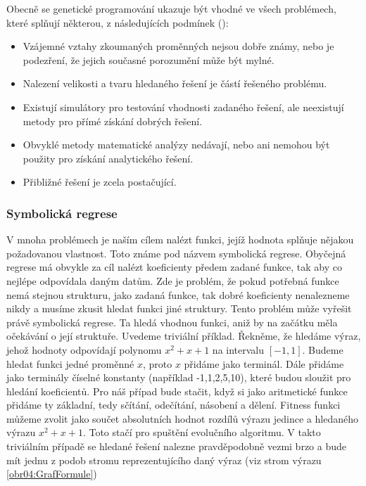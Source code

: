 Obecně se genetické programování ukazuje být vhodné ve všech problémech, které splňují některou, z následujících podmínek (\cite{fieldGuideUsage}):



\begin{itemize}
    \item Vzájemné vztahy zkoumaných proměnných nejsou dobře známy, nebo je podezření, že jejich současné porozumění může být mylné.
    \item Nalezení velikosti a tvaru hledaného řešení je částí řešeného problému.
    \item Existují simulátory pro testování vhodnosti zadaného řešení, ale neexistují metody pro přímé získání dobrých řešení.
    \item Obvyklé metody matematické analýzy nedávají, nebo ani nemohou být použity pro získání analytického řešení.
    \item Přibližné řešení je zcela postačující.
    
\end{itemize}



\subsubsection{Symbolická regrese}
V mnoha problémech je naším cílem nalézt funkci, jejíž hodnota splňuje nějakou požadovanou vlastnost. Toto známe pod názvem symbolická regrese.
Obyčejná regrese má obvykle za cíl nalézt koeficienty předem zadané funkce, tak aby co nejlépe odpovídala daným datům.
Zde je problém, že pokud potřebná funkce nemá stejnou strukturu, jako zadaná funkce, tak dobré koeficienty nenalezneme nikdy a musíme zkusit hledat funkci jiné struktury.
Tento problém může vyřešit právě symbolická regrese. Ta hledá vhodnou funkci, aniž by na začátku měla očekávání o její struktuře.
Uvedeme triviální příklad. Řekněme, že hledáme výraz, jehož hodnoty odpovídají polynomu $x^2+x+1$ na intervalu $[-1,1]$.
Budeme hledat funkci jedné proměnné $x$, proto $x$ přidáme jako terminál. Dále přidáme jako terminály číselné konstanty (například -1,1,2,5,10), které budou sloužit pro hledání koeficientů.
Pro náš případ bude stačit, když si jako aritmetické funkce přidáme ty základní, tedy sčítání, odečítání, násobení a dělení.
Fitness funkci můžeme zvolit jako součet absolutních hodnot rozdílů výrazu jedince a hledaného výrazu $x^2+x+1$.
Toto stačí pro spuštění evolučního algoritmu. 
V takto triviálním případě se hledané řešení nalezne pravděpodobně vezmi brzo a bude mít jednu z podob stromu reprezentujícího daný výraz (viz strom výrazu \ref{obr04:GrafFormule})


